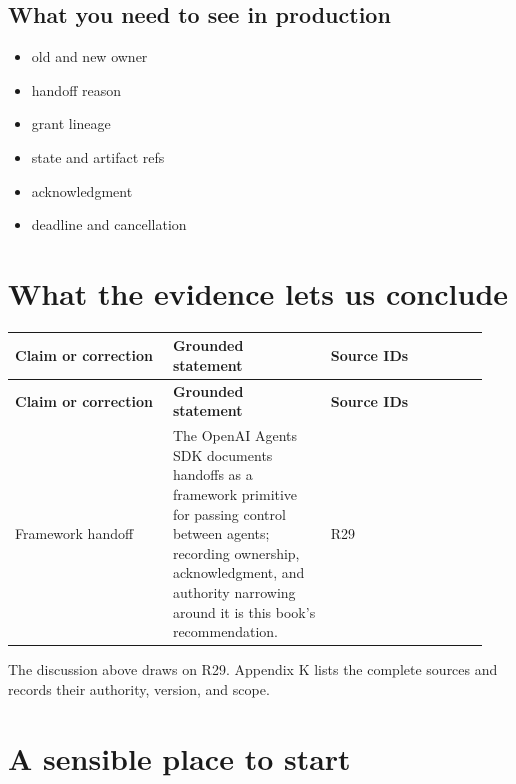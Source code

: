 \subsection{What you need to see in production}

\begin{itemize}

\item old and new owner

\item handoff reason

\item grant lineage

\item state and artifact refs

\item acknowledgment

\item deadline and cancellation

\end{itemize}

\section{What the evidence lets us conclude}

\BookTableStart
\small
\begin{longtable}{@{}Y{0.3133\linewidth}Y{0.3133\linewidth}Y{0.3133\linewidth}@{}}
\color{white}\bfseries \textbf{Claim or correction} & \color{white}\bfseries \textbf{Grounded statement} & \color{white}\bfseries \textbf{Source IDs} \\
\endfirsthead
{}
\color{white}\bfseries \textbf{Claim or correction} & \color{white}\bfseries \textbf{Grounded statement} & \color{white}\bfseries \textbf{Source IDs} \\
\endhead
Framework handoff & The OpenAI Agents SDK documents handoffs as a framework primitive for passing control between agents; recording ownership, acknowledgment, and authority narrowing around it is this book's recommendation. & R29 \\
\end{longtable}
\BookTableEnd

The discussion above draws on R29. Appendix K lists the complete sources and records their authority, version, and scope.\par

\section{A sensible place to start}

